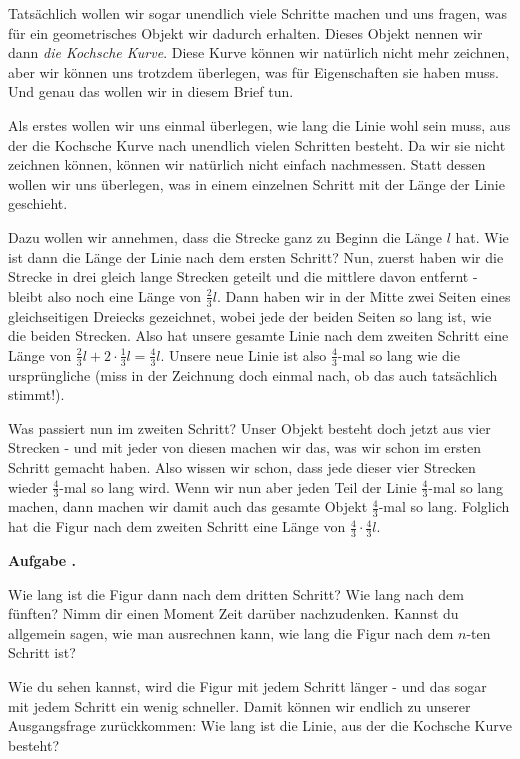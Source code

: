 \documentclass[a4paper,ngerman,12pt]{scrartcl}
\theoremstyle{definition}
\theoremstyle{plain}
\theoremstyle{remark}
\newlength{\aufgabenskip}
\newcounter{aufgabennummer}
\newenvironment{aufgabe}[1]{
  \addtocounter{aufgabennummer}{1}
  \textbf{Aufgabe \theaufgabennummer.} \emph{#1} \par
}{\vspace{\aufgabenskip}}
\begin{document}
Tatsächlich wollen wir sogar \glqq unendlich viele\grqq{} Schritte machen und uns fragen, was für ein geometrisches Objekt wir dadurch erhalten. Dieses Objekt nennen wir dann \emph{die Kochsche Kurve}. Diese Kurve können wir natürlich nicht mehr zeichnen, aber wir können uns trotzdem überlegen, was für Eigenschaften sie haben muss. Und genau das wollen wir in diesem Brief tun. 

Als erstes wollen wir uns einmal überlegen, wie lang die Linie wohl sein muss, aus der die Kochsche Kurve \glqq nach unendlich vielen Schritten\grqq{} besteht. Da wir sie nicht zeichnen können, können wir natürlich nicht einfach nachmessen. Statt dessen wollen wir uns überlegen, was in einem einzelnen Schritt mit der Länge der Linie geschieht.

Dazu wollen wir annehmen, dass die Strecke ganz zu Beginn die Länge $l$ hat. Wie ist dann die Länge der Linie nach dem ersten Schritt? Nun, zuerst haben wir die Strecke in drei gleich lange Strecken geteilt und die mittlere davon entfernt - bleibt also noch eine Länge von $\frac{2}{3}l$. Dann haben wir in der Mitte zwei Seiten eines gleichseitigen Dreiecks gezeichnet, wobei jede der beiden Seiten so lang ist, wie die beiden Strecken. Also hat unsere gesamte Linie nach dem zweiten Schritt eine Länge von $\frac{2}{3}l + 2\cdot\frac{1}{3}l = \frac{4}{3}l$. Unsere neue Linie ist also $\frac{4}{3}$-mal so lang wie die ursprüngliche (miss in der Zeichnung doch einmal nach, ob das auch tatsächlich stimmt!).

Was passiert nun im zweiten Schritt? Unser Objekt besteht doch jetzt aus vier Strecken - und mit jeder von diesen machen wir das, was wir schon im ersten Schritt gemacht haben. Also wissen wir schon, dass jede dieser vier Strecken wieder $\frac{4}{3}$-mal so lang wird. Wenn wir nun aber jeden Teil der Linie $\frac{4}{3}$-mal so lang machen, dann machen wir damit auch das gesamte Objekt $\frac{4}{3}$-mal so lang. Folglich hat die Figur nach dem zweiten Schritt eine Länge von $\frac{4}{3}\cdot\frac{4}{3}l$. 

\begin{aufgabe}{}
	Wie lang ist die Figur dann nach dem dritten Schritt? Wie lang nach dem fünften? Nimm dir einen Moment Zeit darüber nachzudenken. Kannst du allgemein sagen, wie man ausrechnen kann, wie lang die Figur nach dem $n$-ten Schritt ist? 
\end{aufgabe}

Wie du sehen kannst, wird die Figur mit jedem Schritt länger - und das sogar mit jedem Schritt ein wenig schneller. Damit können wir endlich zu unserer Ausgangsfrage zurückkommen: Wie lang ist die Linie, aus der die Kochsche Kurve besteht?
\end{document}
